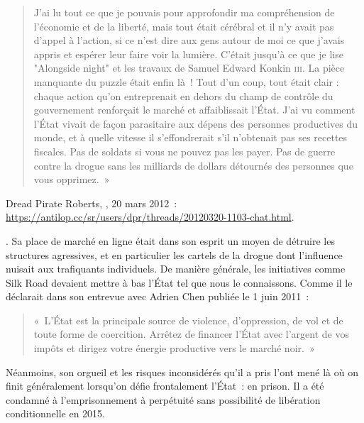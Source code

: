 {\begin{quote}
J'ai lu tout ce que je pouvais pour approfondir ma compréhension de l'économie et de la liberté, mais tout était cérébral et il n'y avait pas d'appel à l'action, si ce n'est dire aux gens autour de moi ce que j'avais appris et espérer leur faire voir la lumière. C'était jusqu'à ce que je lise "Alongside night" et les travaux de Samuel Edward Konkin \textsc{iii}. La pièce manquante du puzzle était enfin là~! Tout d'un coup, tout était clair : chaque action qu'on entreprenait en dehors du champ de contrôle du gouvernement renforçait le marché et affaiblissait l'État. J'ai vu comment l'État vivait de façon parasitaire aux dépens des personnes productives du monde, et à quelle vitesse il s'effondrerait s'il n'obtenait pas ses recettes fiscales. Pas de soldats si vous ne pouvez pas les payer. Pas de guerre contre la drogue sans les milliards de dollars détournés des personnes que vous opprimez.~»
\end{quote}
Dread Pirate Roberts, , 20 mars 2012~: \url{https://antilop.cc/sr/users/dpr/threads/20120320-1103-chat.html}.}. Sa place de marché en ligne était dans son esprit un moyen de détruire les structures agressives, et en particulier les cartels de la drogue dont l'influence nuisait aux trafiquants individuels. De manière générale, les initiatives comme Silk Road devaient mettre à bas l'État tel que nous le connaissons. Comme il le déclarait dans son entrevue avec Adrien Chen publiée le 1\ier{} juin 2011~:

\begin{quote}
«~L'État est la principale source de violence, d'oppression, de vol et de toute forme de coercition. Arrêtez de financer l'État avec l'argent de vos impôts et dirigez votre énergie productive vers le marché noir.~»
\end{quote}

Néanmoins, son orgueil et les risques inconsidérés qu'il a pris l'ont mené là où on finit généralement lorsqu'on défie frontalement l'État~: en prison. Il a été condamné à l'emprisonnement à perpétuité sans possibilité de libération conditionnelle en 2015.


